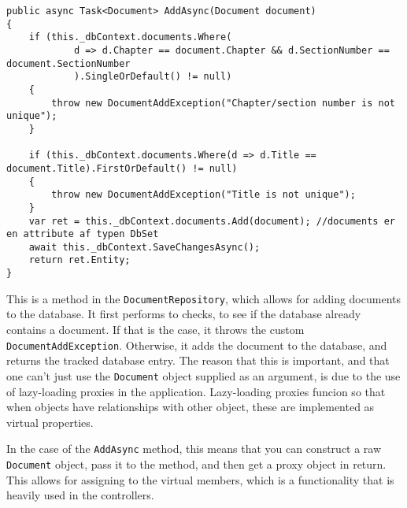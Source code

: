 \begin{lstlisting}
public async Task<Document> AddAsync(Document document)
{
	if (this._dbContext.documents.Where(
			d => d.Chapter == document.Chapter && d.SectionNumber == document.SectionNumber
			).SingleOrDefault() != null)
	{
		throw new DocumentAddException("Chapter/section number is not unique");
	}

	if (this._dbContext.documents.Where(d => d.Title == document.Title).FirstOrDefault() != null)
	{
		throw new DocumentAddException("Title is not unique");
	}
	var ret = this._dbContext.documents.Add(document); //documents er en attribute af typen DbSet
	await this._dbContext.SaveChangesAsync();
	return ret.Entity;
}
\end{lstlisting}
This is a method in the \texttt{DocumentRepository}, which allows for adding documents to the database.
It first performs to checks, to see if the database already contains a document.
If that is the case, it throws the custom \texttt{DocumentAddException}.
Otherwise, it adds the document to the database, and returns the tracked database entry.
The reason that this is important, and that one can't just use the \texttt{Document} object supplied as an argument, is due to the use of lazy-loading proxies in the application.
Lazy-loading proxies funcion so that when objects have relationships with other object, these are implemented as virtual properties.


In the case of the \texttt{AddAsync} method, this means that you can construct a raw \texttt{Document} object, pass it to the method, and then get a proxy object in return.
This allows for assigning to the virtual members, which is a functionality that is heavily used in the controllers.

